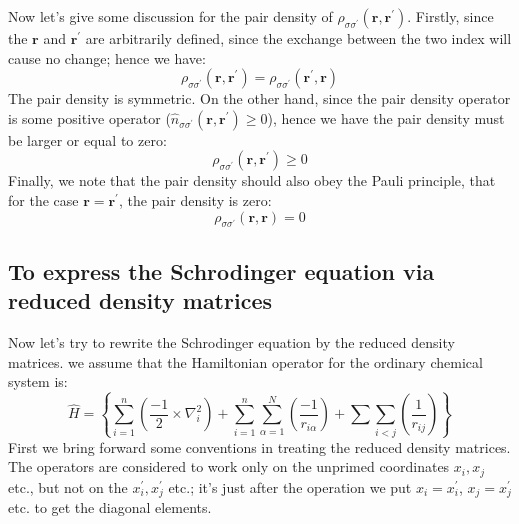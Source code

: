 Now let's give some discussion for the pair density of
$\rho_{\sigma\sigma^{'}}(\bm{r}, \bm{r^{'}})$. Firstly, since the
$\bm{r}$ and $\bm{r^{'}}$ are arbitrarily defined, since the
exchange between the two index will cause no change; hence we have:
\begin{equation}\label{}
\rho_{\sigma\sigma^{'}}(\bm{r}, \bm{r^{'}}) =
\rho_{\sigma\sigma^{'}}(\bm{r^{'}}, \bm{r})
\end{equation}
The pair density is symmetric. On the other hand, since the pair
density operator is some positive operator
($\hat{n}_{\sigma\sigma^{'}}(\bm{r}, \bm{r^{'}}) \geq 0$), hence we
have the pair density must be larger or equal to zero:
\begin{equation}\label{}
\rho_{\sigma\sigma^{'}}(\bm{r}, \bm{r^{'}}) \geq 0
\end{equation}
Finally, we note that the pair density should also obey the Pauli
principle, that for the case $\bm{r} = \bm{r^{'}}$, the pair density
is zero:
\begin{equation}\label{}
\rho_{\sigma\sigma^{'}}(\bm{r}, \bm{r}) = 0
\end{equation}


\subsection{To express the Schrodinger equation via reduced density
  matrices}
%
%
%
%
%
Now let's try to rewrite the Schrodinger equation by the reduced
density matrices. we assume that the Hamiltonian operator for the
ordinary chemical system is:
\begin{equation}\label{DMeq:3}
  \hat{H} = \left\{\sum_{i=1}^{n}(\frac{-1}{2}\times\nabla_{i}^2)+
    \sum_{i=1}^{n}\sum_{\alpha=1}^{N}(\frac{-1}{r_{i\alpha}})+
    \sum\sum_{i<j}(\frac{1}{r_{ij}}) \right\}
\end{equation}
First we bring forward some conventions in treating the reduced
density matrices. The operators are considered to work only on the
unprimed coordinates $x_{i}, x_{j}$ etc., but not on the $x_{i}^{'},
x_{j}^{'}$ etc.; it's just after the operation we put $x_{i} =
x_{i}^{'}$, $x_{j} = x_{j}^{'}$ etc. to get the diagonal elements.


